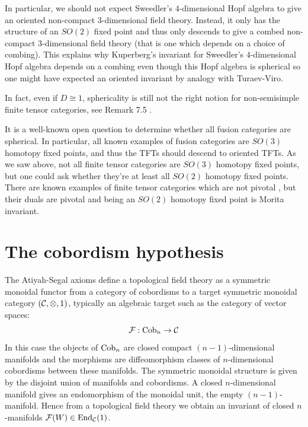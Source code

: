 \documentclass{amsart}
\begin{document}
\begin{remark}
In particular, we should not expect Sweedler's $4$-dimensional Hopf algebra to give an oriented non-compact $3$-dimensional field theory.  Instead, it only has the structure of an $SO(2)$ fixed point and thus only descends to give a combed non-compact $3$-dimensional field theory (that is one which depends on a choice of combing).  This explains why Kuperberg's invariant for Sweedler's $4$-dimensional Hopf algebra depends on a combing even though this Hopf algebra is spherical so one might have expected an oriented invariant by analogy with Turaev-Viro.
\end{remark}

In fact, even if $D \cong 1$, sphericality is still not the right notion for non-semisimple finite tensor categories, see Remark 7.5 \cite{???}.

\begin{remark}
It is a well-known open question to determine whether all fusion categories are spherical.  In particular, all known examples of fusion categories are $SO(3)$ homotopy fixed points, and thus the TFTs should descend to oriented TFTs.  As we saw above, not all finite tensor categories are $SO(3)$ homotopy fixed points, but one could ask whether they're at least all $SO(2)$ homotopy fixed points.  There are known examples of finite tensor categories which are not pivotal \cite{???}, but their duals are pivotal and being an $SO(2)$ homotopy fixed point is Morita invariant.
\end{remark} 


\appendix 
\renewcommand{\thesubsection}{\Alph{section}.{\arabic{subsection}}}

\section{The cobordism hypothesis}

The Atiyah-Segal axioms define a topological field theory as a symmetric monoidal functor from a category of cobordisms to a target symmetric monoidal category $(\mathcal C, \otimes, 1)$, typically an algebraic target such as the category of vector spaces: 
\begin{equation*}
	\mathcal F: \mathrm{Cob}_n \to \mathcal C
\end{equation*}
In this case the objects of $\mathrm{Cob}_n$ are closed compact $(n-1)$-dimensional manifolds and the morphisms are diffeomorphism classes of $n$-dimensional cobordisms between these manifolds. The symmetric monoidal structure is given by the disjoint union of manifolds and cobordisms. A closed $n$-dimensional manifold gives an endomorphism of the monoidal unit, the empty $(n-1)$-manifold. Hence from a topological field theory we obtain an invariant of closed $n$-manifolds $\mathcal F(W) \in \operatorname{End}_{\mathcal C}(1)$.  
\end{document}
